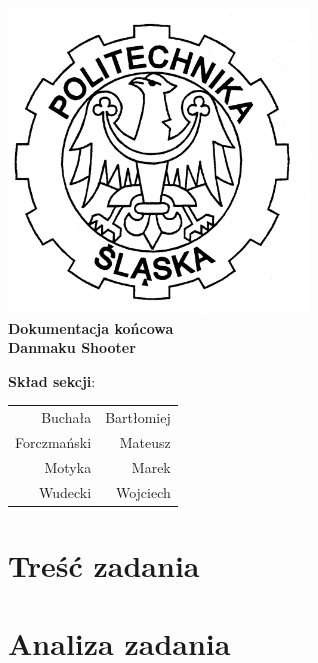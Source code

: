 \documentclass[a4paper,twoside]{article}
\begin{document}
\begin{titlepage}
		\centering
		\includegraphics[width=0.6\textwidth]{./images/logo.png}
		\\\vspace{10mm}
		\textbf{{\huge Dokumentacja końcowa}}\\\vspace{5mm}
		\textbf{{\Huge Danmaku Shooter}}
		\\
		\vfill
		\begin{flushright}
			{\Large \textbf{Skład sekcji}:}\\
			\begin{tabular}{rr}
				{\Large Buchała} & {\Large Bartłomiej}\\[-3pt]
				{\Large Forczmański} & {\Large Mateusz}\\[-3pt]
				{\Large Motyka} & {\Large Marek}\\[-3pt]
				{\Large Wudecki} & {\Large Wojciech}
			\end{tabular}
		\end{flushright}
		
	\end{titlepage}
	
	\part{\huge \textbf{Treść zadania}}
	
	\newpage
	\part{\huge \textbf{Analiza zadania}}
\end{document}
